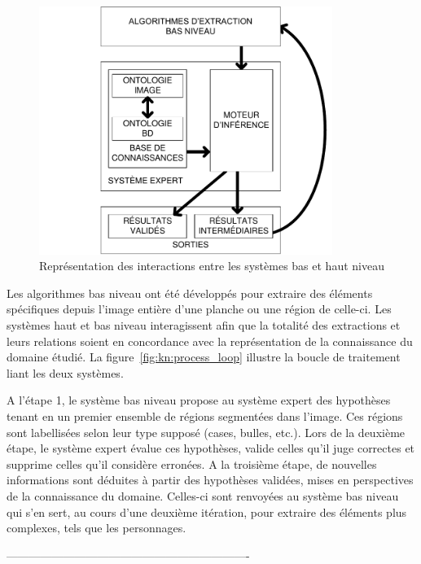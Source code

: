 \begin{figure}[h!]
\begin{center}
\includegraphics[width=0.85\textwidth]{expert_system_v2.pdf}
\caption[Représentation du système d'analyse]{Représentation des interactions entre les systèmes bas et haut niveau}
\label{fig:expertSystem}
\end{center}
\end{figure}

Les algorithmes bas niveau ont été développés pour extraire des éléments spécifiques depuis l'image entière d'une planche ou une région de celle-ci.
Les systèmes haut et bas niveau interagissent afin que la totalité des extractions et leurs relations soient en concordance avec la représentation de la connaissance du domaine étudié.
La figure~\ref{fig:kn:process_loop} illustre la boucle de traitement liant les deux systèmes.

A l'étape 1, le système bas niveau propose au système expert des hypothèses tenant en un premier ensemble de régions segmentées dans l'image.
Ces régions sont labellisées selon leur type supposé (cases, bulles, etc.).
Lors de la deuxième étape, le système expert évalue ces hypothèses, valide celles qu'il juge correctes et supprime celles qu'il considère erronées.
A la troisième étape, de nouvelles informations sont déduites à partir des hypothèses validées, mises en perspectives de la connaissance du domaine.
Celles-ci sont renvoyées au système bas niveau qui s'en sert, au cours d'une deuxième itération, pour extraire des éléments plus complexes, tels que les personnages.

----------------------------------------------------------------

